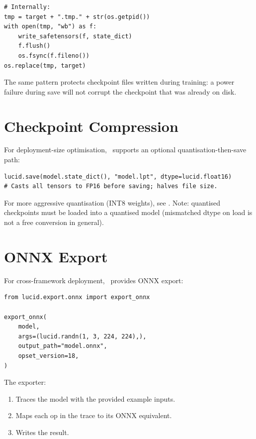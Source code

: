 \begin{lstlisting}[style=lucid,language=LucidPython]
# Internally:
tmp = target + ".tmp." + str(os.getpid())
with open(tmp, "wb") as f:
    write_safetensors(f, state_dict)
    f.flush()
    os.fsync(f.fileno())
os.replace(tmp, target)
\end{lstlisting}

The same pattern protects checkpoint files written during
training: a power failure during save will not corrupt the
checkpoint that was already on disk.

\section{Checkpoint Compression}
\label{sec:serialization:compression}

For deployment-size optimisation, \Lucid\ supports an optional
quantisation-then-save path:

\begin{lstlisting}[style=lucid,language=LucidPython]
lucid.save(model.state_dict(), "model.lpt", dtype=lucid.float16)
# Casts all tensors to FP16 before saving; halves file size.
\end{lstlisting}

For more aggressive quantisation (INT8 weights), see
. Note: quantised checkpoints
must be loaded into a quantised model (mismatched dtype on
load is not a free conversion in general).

\section{ONNX Export}
\label{sec:serialization:onnx}

For cross-framework deployment, \Lucid\ provides ONNX
\cite{onnx_2017} export:

\begin{lstlisting}[style=lucid,language=LucidPython]
from lucid.export.onnx import export_onnx

export_onnx(
    model,
    args=(lucid.randn(1, 3, 224, 224),),
    output_path="model.onnx",
    opset_version=18,
)
\end{lstlisting}

The exporter:
\begin{enumerate}
  \item Traces the model with the provided example inputs.
  \item Maps each op in the trace to its ONNX equivalent.
  \item Writes the result.
\end{enumerate}

